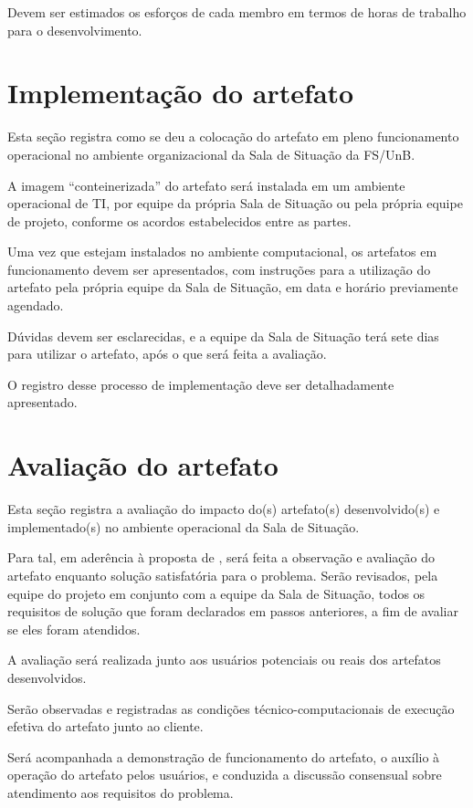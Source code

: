 \documentclass[12pt]{article}
\begin{document}
	Devem ser estimados os esforços de cada membro em termos de horas de trabalho para o desenvolvimento.
	
	\section{Implementação do artefato\label{ImplArtefato}}
	
	Esta seção registra como se deu a colocação do artefato em pleno funcionamento operacional no ambiente organizacional da Sala de Situação da FS/UnB.
	
	A imagem ``conteinerizada'' do artefato será instalada em um ambiente operacional de TI, por equipe da própria Sala de Situação ou pela própria equipe de projeto, conforme os acordos estabelecidos entre as partes.
	
	Uma vez que estejam instalados no ambiente computacional, os artefatos em funcionamento devem ser apresentados, com instruções para a utilização do artefato pela própria equipe da Sala de Situação, em data e horário previamente agendado.
	
	Dúvidas devem ser esclarecidas, e a equipe da Sala de Situação terá sete dias para utilizar o artefato, após o que será feita a avaliação.
	
	O registro desse processo de implementação deve ser detalhadamente apresentado.
	
	\section{Avaliação do artefato\label{Sec:CP:AvalArtefato}}
	
	Esta seção registra a avaliação do impacto do(s) artefato(s) desenvolvido(s) e implementado(s) no ambiente operacional da Sala de Situação.

	Para tal, em aderência à proposta de \citep{dresch_design_2015}, será feita a observação e avaliação do artefato enquanto solução satisfatória para o problema.
	Serão revisados, pela equipe do projeto em conjunto com a equipe da Sala de Situação, todos os requisitos de solução que foram declarados em passos anteriores, a fim de avaliar se eles foram atendidos.

	A avaliação será realizada junto aos usuários potenciais ou reais dos artefatos desenvolvidos. 

	Serão observadas e registradas as condições técnico-computacionais de execução efetiva do artefato junto ao cliente.

	Será acompanhada a demonstração de funcionamento do artefato, o auxílio à operação do artefato pelos usuários, e conduzida a discussão consensual sobre atendimento aos requisitos do problema.
\end{document}
